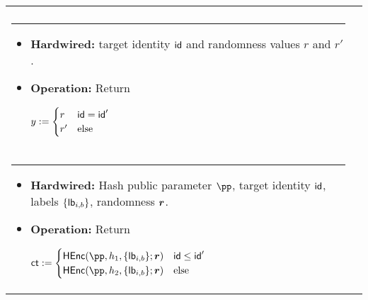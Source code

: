   
\begin{table}[t!]
\centering
\begin{tabular}{| l | l |}
	\hline 			
	\begin{minipage}[t]{0.50\textwidth}
	\vspace{-5pt} 
	{\bf Circuit $\al{F}[ \id,  r , r'](\id', x , x')$:} \\
		\rule[6pt]{\textwidth}{1pt}
\begin{itemize}
    \item \textbf{Hardwired:} target identity $\mathsf{id}$ and  randomness values  $r$ and $r'$.
    \item \textbf{Operation:} Return
    
    
    $y :=
		    \begin{cases}   
                r & \mathsf{id} = \mathsf{id}'  \\
                r' & \text{else}
		    \end{cases}
		$
\end{itemize}
	\end{minipage}
	&
	\begin{minipage}[t]{0.50\textwidth}
	\vspace{-5pt} 
	{\bf Circuit $\al{V}[\pp , \id, \{\lb_{i,b}\},  \bo{r}](h_1, h_2 , \id')$:} \\
		\rule[6pt]{\textwidth}{1pt}
\begin{itemize}
    \item \textbf{Hardwired:}  Hash public parameter $\pp$,  target identity $\mathsf{id}$, labels $\{\mathsf{lb}_{i,b}\}$, randomness $\boldsymbol{r}$.
    \item \textbf{Operation:} Return
    
    
    $\ct :=
		    \begin{cases}   
                \HEnc(\pp,h_1 , \{\lb_{i,b} \};\bo{r}) & \id \leq \id' \\
                \HEnc(\pp,h_2 , \{\lb_{i,b} \};\bo{r}) & \text{else}
		    \end{cases}
		$
\end{itemize}
	\end{minipage}
	\end{tabular}
\vspace{3pt}


\end{table}

